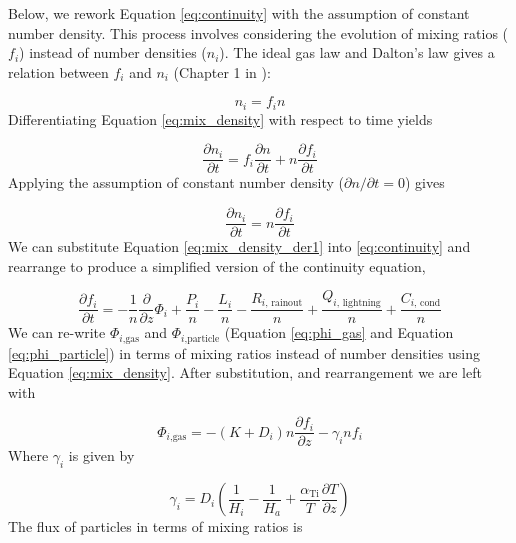 \documentclass{article}
\begin{document}
Below, we rework Equation \eqref{eq:continuity} with the assumption of constant number density. This process involves considering the evolution of mixing ratios ($f_i$) instead of number densities ($n_i$). The ideal gas law and Dalton's law gives a relation between $f_i$ and $n_i$ (Chapter 1 in \cite{Catling_2017}):

\begin{equation} \label{eq:mix_density}
  n_i = f_i n
\end{equation}
Differentiating Equation \eqref{eq:mix_density} with respect to time yields

\begin{equation} \label{eq:mix_density_der}
  \frac{\partial n_i}{\partial t} = f_i \frac{\partial n}{\partial t} + n \frac{\partial f_i}{\partial t}
\end{equation}
Applying the assumption of constant number density ($\partial n / \partial t = 0$) gives

\begin{equation} \label{eq:mix_density_der1}
  \frac{\partial n_i}{\partial t} = n \frac{\partial f_i}{\partial t}
\end{equation}
We can substitute Equation \eqref{eq:mix_density_der1} into \eqref{eq:continuity} and rearrange to produce a simplified version of the continuity equation,

\begin{equation} \label{eq:continuity_simple}
  \frac{\partial f_{i}}{\partial t} = - \frac{1}{n}\frac{\partial}{\partial z}\Phi_{i} + \frac{P_{i}}{n} - \frac{L_{i}}{n} - \frac{R_{i\text{, rainout}}}{n} + \frac{Q_{i\text{, lightning}}}{n} + \frac{C_{i\text{, cond}}}{n}
\end{equation}
We can re-write $\Phi_{i\text{,gas}}$ and $\Phi_{i\text{,particle}}$ (Equation \eqref{eq:phi_gas} and Equation \eqref{eq:phi_particle}) in terms of mixing ratios instead of number densities using Equation \eqref{eq:mix_density}. After substitution, and rearrangement we are left with

\begin{equation} \label{eq:phi_gas_1}
  \Phi_{i\text{,gas}} = - \left( K + D_{i} \right)n\frac{\partial f_{i}}{\partial z} - \gamma_{i}nf_{i}
\end{equation}
Where $\gamma_{i}$ is given by

\begin{equation}
  \gamma_{i} = D_{i}\left( \frac{1}{H_{i}} - \frac{1}{H_{a}} + \frac{\alpha_{\text{Ti}}}{T}\frac{\partial T}{\partial z} \right)
\end{equation}
The flux of particles in terms of mixing ratios is
\end{document}

